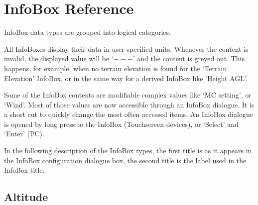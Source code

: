 \chapter{InfoBox Reference}\label{cha:infobox}
InfoBox data types are grouped into logical categories.

All InfoBoxes display their data in user-specified units.  Whenever the content 
is invalid, the displayed value will be `$---$' and the content is
greyed out.  This happens, for example, when no terrain elevation is found for 
the `Terrain Elevation' InfoBox, or in the same way for a derived InfoBox like 
`Height AGL'.

Some of the InfoBox contents are modifiable complex values like `MC setting', or `Wind'. Most of 
those values are now accessible through an InfoBox dialogue. It is a short cut to quickly 
change the most often accessed items. An InfoBox dialogue is opened by long press to the InfoBox 
(Touchscreen devices), or `Select' and `Enter' (PC).

In the following description of the InfoBox types, the first
title is as it appears in the InfoBox configuration dialogue box, the
second title is the label used in the InfoBox title.

\newcommand{\ibi}[3]{%
\jindent{
\begin{tabular}{r}
{\bf #1} \\
\infobox{{#2}} \\
\end{tabular}}{#3}
}
\newcommand{\ibig}[4]{%
\jindent{
\begin{tabular}{r}
{\bf #1} \\
\infobox{{#2}} \\
\texttt{[image: \#4]} \\
\end{tabular}}{#3}
}


\section{Altitude}

